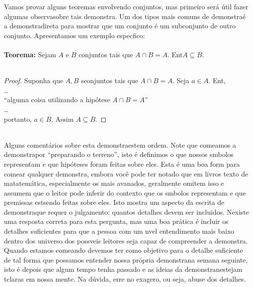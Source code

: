 Vamos provar alguns teoremas envolvendo conjuntos, mas primeiro ser\'a \'util fazer algumas observa\coes sobre tais demonstra\cois. Um dos tipos mais comuns de demonstra\cao \'e a demonstra\cao direta para mostrar que um conjunto \'e um subconjunto de outro conjunto. Apresentamos um exemplo espec\ih fico:
\\
\\
{\bf Teorema:} Sejam $A$ e $B$ conjuntos tais que $A\cap B=A$. Ent\ao $A\subseteq B.$
\\
\\
\begin{proof} 
Suponha que $A,B$ s\ao conjuntos tais que $A\cap B=A$. Seja $a\in A.$ Ent\aoi,
\\
\ldots
\\ 
``alguma coisa utilizando a hip\'otese  $A\cap B=A$''
\\
\ldots
\\
portanto, $a\in B$. Assim $A\subseteq B.$
\end{proof}
\\ 

Alguns coment\'arios sobre esta demonstra\cao est\ao em ordem. Note que come\cc amos a demonstra\cao por ``preparando o terreno'', isto \'e definimos o que nossos s\ih mbolos representam e que hip\'oteses foram feitas sobre eles. Esta \'e uma boa form para come\cc ar qualquer demonstra\caoi, embora voc\^e pode ter notado que em livros texto de matatem\'atica, especialmente os mais avan\cc ados, geralmente omitem isso e assumem que o leitor pode inferir do contexto que os s\ih mbolos representam e que premissas est\ao sendo feitas sobre eles. Isto mostra um aspecto da escrita de demonstra\coes que requer o julgamento: quantos detalhes devem ser incluidos. N\ao existe uma resposta correta para esta pergunta, mas uma boa pr\'atica \'e incluir os detalhes suficientes para que a pessoa com um n\ih vel entendimento mais baixo dentro dos universo dos poss\ih veis leitores seja capaz de compreender a demonstra\caoi. Quando estamos come\cc ando devemos ter como objetivo para o detalhe suficiente de tal forma que possamos entender nossa pr\'opria demonstra\cao na semana seguinte, isto \'e depois que algum tempo tenha passado e as ideias da demonstra\cao n\ao estejam t\ao claras em nossa mente. Na d\'uvida, erre no exagero, ou seja, abuse dos detalhes.

